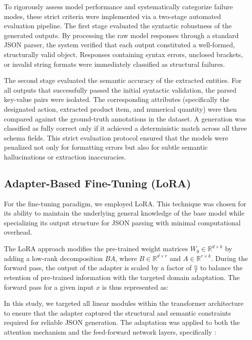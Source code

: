 \documentclass[journal,article,submit,pdftex,moreauthors]{Definitions/mdpi}
\begin{document}
To rigorously assess model performance and systematically categorize failure modes, these strict criteria were implemented via a two-stage automated evaluation pipeline. The first stage evaluated the syntactic robustness of the generated outputs. By processing the raw model responses through a standard JSON parser, the system verified that each output constituted a well-formed, structurally valid object. Responses containing syntax errors, unclosed brackets, or invalid string formats were immediately classified as structural failures.

The second stage evaluated the semantic accuracy of the extracted entities. For all outputs that successfully passed the initial syntactic validation, the parsed key-value pairs were isolated. The corresponding attributes (specifically the designated action, extracted product item, and numerical quantity) were then compared against the ground-truth annotations in the dataset. A generation was classified as fully correct only if it achieved a deterministic match across all three schema fields. This strict evaluation protocol ensured that the models were penalized not only for formatting errors but also for subtle semantic hallucinations or extraction inaccuracies.


\subsection{Adapter-Based Fine-Tuning (LoRA)}
For the fine-tuning paradigm, we employed LoRA. This technique was chosen for its ability to maintain the underlying general knowledge of the base model while specializing its output structure for JSON parsing with minimal computational overhead.

The LoRA approach modifies the pre-trained weight matrices $W_0 \in \mathbb{R}^{d \times k}$ by adding a low-rank decomposition $BA$, where $B \in \mathbb{R}^{d \times r}$ and $A \in \mathbb{R}^{r \times k}$. During the forward pass, the output of the adapter is scaled by a factor of $\frac{\alpha}{r}$ to balance the retention of pre-trained information with the targeted domain adaptation. The forward pass for a given input $x$ is thus represented as:

In this study, we targeted all linear modules within the transformer architecture to ensure that the adapter captured the structural and semantic constraints required for reliable JSON generation. The adaptation was applied to both the attention mechanism and the feed-forward network layers, specifically \cite{hu2022lora}:
\end{document}
